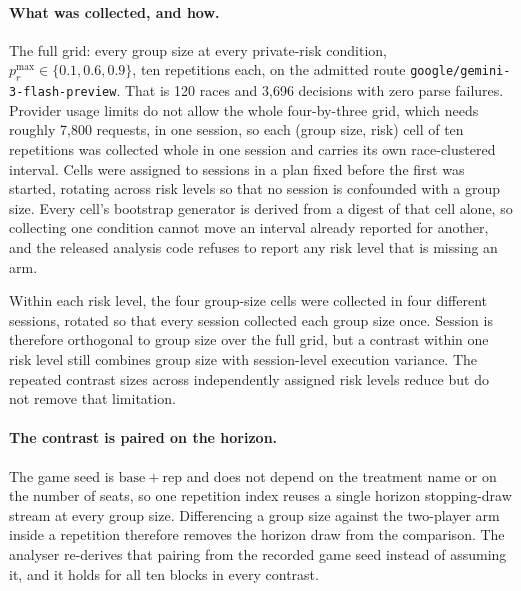 \documentclass{article}
\begin{document}
\paragraph{What was collected, and how.} The full grid: every group size at
every private-risk condition, $p_r^{\max}\in\{0.1,0.6,0.9\}$, ten repetitions
each, on the admitted route
\texttt{google/\discretionary{}{}{}gemini-\discretionary{}{}{}3-\discretionary{}{}{}flash-\discretionary{}{}{}preview}. That is 120 races and 3{,}696
decisions
with zero parse failures. Provider usage limits do not allow the whole four-by-three grid, which needs
roughly 7{,}800 requests, in one session, so each (group size, risk) cell of ten
repetitions was collected whole in one session and carries its own
race-clustered interval. Cells were assigned to sessions in a plan fixed before
the first was started, rotating across risk levels so that no session is
confounded with a group size. Every cell's bootstrap generator is derived
from a digest of that cell alone, so collecting one condition cannot move an
interval already reported for another, and the released analysis code refuses
to report any risk level that is missing an arm.

Within each risk level, the four group-size cells were collected in four
different sessions, rotated so that every session collected each group size
once. Session is therefore orthogonal to group size over the full grid, but a
contrast within one risk level still combines group size with session-level
execution variance. The repeated contrast sizes across independently assigned
risk levels reduce but do not remove that limitation.

\paragraph{The contrast is paired on the horizon.} The game seed is
$\mathrm{base} + \mathrm{rep}$ and does not depend on the treatment name or on
the number of seats, so one repetition index reuses a single horizon
stopping-draw stream at every group size. Differencing a group size against the
two-player arm inside a repetition therefore removes the horizon draw from the
comparison. The analyser re-derives that pairing from the recorded game seed
instead of assuming it, and it holds for all ten blocks in every contrast.
\end{document}
